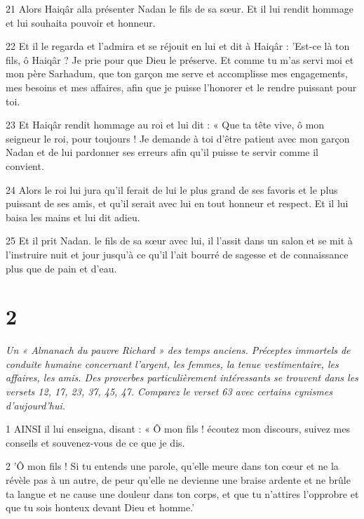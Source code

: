 \par 21 Alors Haiqâr alla présenter Nadan le fils de sa sœur. Et il lui rendit hommage et lui souhaita pouvoir et honneur.

\par 22 Et il le regarda et l'admira et se réjouit en lui et dit à Haiqâr : 'Est-ce là ton fils, ô Haiqâr ? Je prie pour que Dieu le préserve. Et comme tu m'as servi moi et mon père Sarhadum, que ton garçon me serve et accomplisse mes engagements, mes besoins et mes affaires, afin que je puisse l'honorer et le rendre puissant pour toi.

\par 23 Et Haiqâr rendit hommage au roi et lui dit : « Que ta tête vive, ô mon seigneur le roi, pour toujours ! Je demande à toi d'être patient avec mon garçon Nadan et de lui pardonner ses erreurs afin qu'il puisse te servir comme il convient.

\par 24 Alors le roi lui jura qu'il ferait de lui le plus grand de ses favoris et le plus puissant de ses amis, et qu'il serait avec lui en tout honneur et respect. Et il lui baisa les mains et lui dit adieu.

\par 25 Et il prit Nadan. le fils de sa sœur avec lui, il l'assit dans un salon et se mit à l'instruire nuit et jour jusqu'à ce qu'il l'ait bourré de sagesse et de connaissance plus que de pain et d'eau.



\chapter{2}

\par \textit{Un « Almanach du pauvre Richard » des temps anciens. Préceptes immortels de conduite humaine concernant l'argent, les femmes, la tenue vestimentaire, les affaires, les amis. Des proverbes particulièrement intéressants se trouvent dans les versets 12, 17, 23, 37, 45, 47. Comparez le verset 63 avec certains cynismes d'aujourd'hui.}

\par 1 AINSI il lui enseigna, disant : « Ô mon fils ! écoutez mon discours, suivez mes conseils et souvenez-vous de ce que je dis.

\par 2 'Ô mon fils ! Si tu entends une parole, qu'elle meure dans ton cœur et ne la révèle pas à un autre, de peur qu'elle ne devienne une braise ardente et ne brûle ta langue et ne cause une douleur dans ton corps, et que tu n'attires l'opprobre et que tu sois honteux devant Dieu et homme.'

